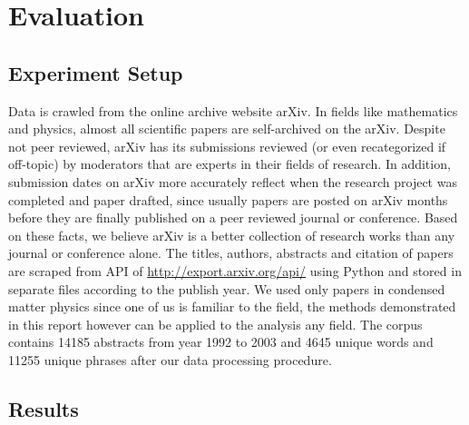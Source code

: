 \documentclass[DIV=calc, paper=letter, fontsize=10pt, twocolumn]{scrartcl}	 %
\begin{document}
\section*{Evaluation}

\subsection*{Experiment Setup}
Data is crawled from the online archive website arXiv. In fields like mathematics and physics, almost all scientific papers are self-archived on the arXiv. Despite not peer reviewed, arXiv has its submissions reviewed (or even recategorized if off-topic) by moderators that are experts in their fields of research. In addition, submission dates on arXiv more accurately reflect when the research project was completed and paper drafted, since usually papers are posted on arXiv months before they are finally published on a peer reviewed journal or conference. Based on these facts, we believe arXiv is a better collection of research works than any journal or conference alone.\newline
The titles, authors, abstracts and citation of papers are scraped from API of \url{http://export.arxiv.org/api/} using Python and stored in separate files according to the publish year. We used only papers in condensed matter physics since one of us is familiar to the field, the methods demonstrated in this report however can be applied to the analysis any field. The corpus contains 14185 abstracts from year 1992 to 2003 and 4645 unique words and 11255 unique phrases after our data processing procedure.


\subsection*{Results}
\end{document}
